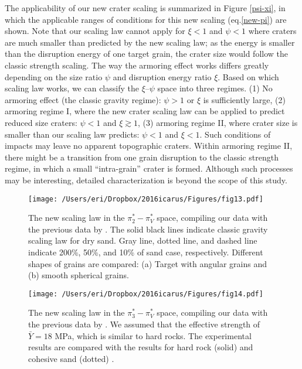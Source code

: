 \documentclass[3p,authoryear]{elsarticle}
\newcommand{\II}{I\hspace{-.1 em}I}
\begin{document}
The applicability of our new crater scaling is summarized in Figure \ref{psi-xi}, in which the applicable ranges of conditions for this new scaling (eq.\eqref{new-pi}) are shown. Note that our scaling law cannot apply for $\xi<1$ and $\psi<1$ where craters are much smaller than predicted by the new scaling law; as the energy is smaller than the disruption energy of one target grain, the crater size would follow the classic strength scaling. The way the armoring effect works differs greatly depending on the size ratio $\psi$ and disruption energy ratio $\xi$. Based on which scaling law works, we can classify the $\xi$--$\psi$ space into three regimes. (1) No armoring effect (the classic gravity regime): $\psi>1$ or $\xi$ is sufficiently large, (2) armoring regime I, where the new crater scaling law can be applied to predict reduced size craters: $\psi<1$ and $\xi \gtrsim 1$, (3) armoring regime {\II}, where crater size is smaller than our scaling law predicts: $\psi<1$ and $\xi<1$. Such conditions of impacts may leave no apparent topographic craters. Within armoring regime \II, there might be a transition from one grain disruption to the classic strength regime, in which a small ``intra-grain'' crater is formed. Although such processes may be interesting, detailed characterization is beyond the scope of this study.

\begin{figure*}[tbp]
	\centering
	\texttt{[image: /Users/eri/Dropbox/2016icarus/Figures/fig13.pdf]}
	\caption{The new scaling law in the $\pi_2^*- \pi_V^*$ space, compiling our data with the previous data by \citet{schmidt1980, mizutani1983, cintala1999, yamamoto2006, guettler2012, holsapple2014}. The solid black lines indicate classic gravity scaling law for dry sand. Gray line, dotted line, and dashed line indicate 200\%, 50\%, and 10\% of sand case, respectively. Different shapes of grains are compared: (a) Target with angular grains and (b) smooth spherical grains.}
	\label{newpi2}
	\centering
\end{figure*}
\begin{figure}[htbp]
	\centering
	\texttt{[image: /Users/eri/Dropbox/2016icarus/Figures/fig14.pdf]}
	\caption{The new scaling law in the $\pi_3^*- \pi_V^*$ space, compiling our data with the previous data by \citet{schmidt1980, mizutani1983, cintala1999, yamamoto2006, guettler2012, holsapple2014}. We assumed that the effective strength of $\bar{Y}=18$ MPa, which is similar to hard rocks. The experimental results are compared with the results for hard rock (solid) and cohesive sand (dotted) \citep{schmidt1987}.}
	\label{newpi3}
	\centering
\end{figure}
\end{document}
